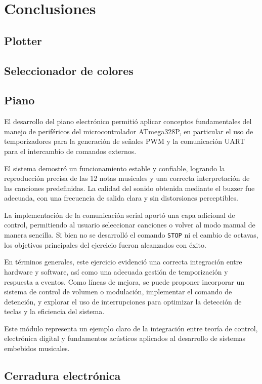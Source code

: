 
\section{Conclusiones}

\subsection{Plotter}

\subsection{Seleccionador de colores}

\subsection{Piano}
El desarrollo del piano electrónico permitió aplicar conceptos fundamentales del manejo de periféricos del microcontrolador ATmega328P, en particular el uso de temporizadores para la generación de señales PWM y la comunicación UART para el intercambio de comandos externos.  

El sistema demostró un funcionamiento estable y confiable, logrando la reproducción precisa de las 12 notas musicales y una correcta interpretación de las canciones predefinidas. La calidad del sonido obtenida mediante el buzzer fue adecuada, con una frecuencia de salida clara y sin distorsiones perceptibles.  

La implementación de la comunicación serial aportó una capa adicional de control, permitiendo al usuario seleccionar canciones o volver al modo manual de manera sencilla. Si bien no se desarrolló el comando \texttt{STOP} ni el cambio de octavas, los objetivos principales del ejercicio fueron alcanzados con éxito.  

En términos generales, este ejercicio evidenció una correcta integración entre hardware y software, así como una adecuada gestión de temporización y respuesta a eventos. Como líneas de mejora, se puede proponer incorporar un sistema de control de volumen o modulación, implementar el comando de detención, y explorar el uso de interrupciones para optimizar la detección de teclas y la eficiencia del sistema.

Este módulo representa un ejemplo claro de la integración entre teoría de control, electrónica digital y fundamentos acústicos aplicados al desarrollo de sistemas embebidos musicales.

\subsection{Cerradura electrónica}

